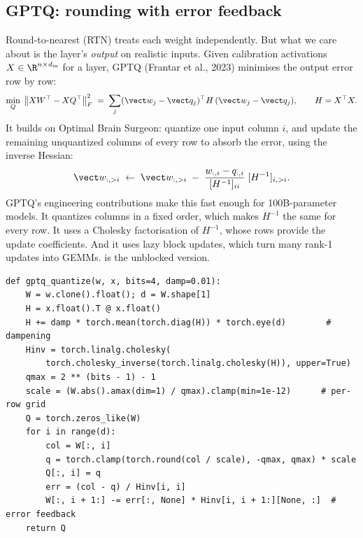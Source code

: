 \subsection{GPTQ: rounding with error feedback}
Round-to-nearest (RTN) treats each weight independently. But what we care about is the
layer's \emph{output} on realistic inputs. Given calibration activations
$X\in\R^{n\times d_{\text{in}}}$ for a layer, GPTQ (Frantar et al., 2023) minimises the
output error row by row:
\begin{equation}
  \min_{Q}\; \big\| X W^\top - X Q^\top \big\|_F^2
  \;=\; \sum_j (\vect w_j - \vect q_j)^\top H\, (\vect w_j - \vect q_j),
  \qquad H = X^\top X .
  \label{eq:efficient:gptq}
\end{equation}
It builds on Optimal Brain Surgeon: quantize one input column $i$, and update the
remaining unquantized columns of every row to absorb the error, using the inverse
Hessian:
\begin{equation}
  \vect w_{:,>i} \;\leftarrow\; \vect w_{:,>i} \;-\;
  \frac{w_{:,i}-q_{:,i}}{[H^{-1}]_{ii}}\; [H^{-1}]_{i,>i} .
\end{equation}
GPTQ's engineering contributions make this fast enough for 100B-parameter models. It
quantizes columns in a fixed order, which makes $H^{-1}$ the same for every row. It
uses a Cholesky factorisation of $H^{-1}$, whose rows provide the update coefficients.
And it uses lazy block updates, which turn many rank-1 updates into GEMMs.
 is the unblocked version.

\begin{lstlisting}[caption={GPTQ without lazy batching. On correlated calibration
inputs it gives lower output error than RTN on the same grid.},label={lst:efficient:gptq}]
def gptq_quantize(w, x, bits=4, damp=0.01):
    W = w.clone().float(); d = W.shape[1]
    H = x.float().T @ x.float()
    H += damp * torch.mean(torch.diag(H)) * torch.eye(d)        # dampening
    Hinv = torch.linalg.cholesky(
        torch.cholesky_inverse(torch.linalg.cholesky(H)), upper=True)
    qmax = 2 ** (bits - 1) - 1
    scale = (W.abs().amax(dim=1) / qmax).clamp(min=1e-12)      # per-row grid
    Q = torch.zeros_like(W)
    for i in range(d):
        col = W[:, i]
        q = torch.clamp(torch.round(col / scale), -qmax, qmax) * scale
        Q[:, i] = q
        err = (col - q) / Hinv[i, i]
        W[:, i + 1:] -= err[:, None] * Hinv[i, i + 1:][None, :]  # error feedback
    return Q
\end{lstlisting}

